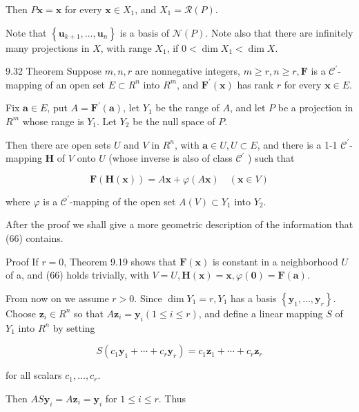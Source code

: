 \documentclass[10pt]{article}
\begin{document}
Then $P \mathbf{x}=\mathbf{x}$ for every $\mathbf{x} \in X_{1}$, and $X_{1}=\mathscr{R}(P)$.

Note that $\left\{\mathbf{u}_{k+1}, \ldots, \mathbf{u}_{n}\right\}$ is a basis of $\mathcal{N}(P)$. Note also that there are infinitely many projections in $X$, with range $X_{1}$, if $0<\operatorname{dim} X_{1}<\operatorname{dim} X$.

9.32 Theorem Suppose $m, n, r$ are nonnegative integers, $m \geq r, n \geq r, \mathbf{F}$ is a $\mathscr{C}^{\prime}$-mapping of an open set $E \subset R^{n}$ into $R^{m}$, and $\mathbf{F}^{\prime}(\mathbf{x})$ has rank $r$ for every $\mathbf{x} \in E$.

Fix $\mathbf{a} \in E$, put $A=\mathbf{F}^{\prime}(\mathbf{a})$, let $Y_{1}$ be the range of $A$, and let $P$ be a projection in $R^{m}$ whose range is $Y_{1}$. Let $Y_{2}$ be the null space of $P$.

Then there are open sets $U$ and $V$ in $R^{n}$, with $\mathbf{a} \in U, U \subset E$, and there is a 1-1 $\mathscr{C}^{\prime}$-mapping $\mathbf{H}$ of $V$ onto $U$ (whose inverse is also of class $\mathscr{C}^{\prime}$ ) such that

$$
\mathbf{F}(\mathbf{H}(\mathbf{x}))=A \mathbf{x}+\varphi(A \mathbf{x}) \quad(\mathbf{x} \in V)
$$

where $\varphi$ is a $\mathscr{C}^{\prime}$-mapping of the open set $A(V) \subset Y_{1}$ into $Y_{2}$.

After the proof we shall give a more geometric description of the information that (66) contains.

Proof If $r=0$, Theorem 9.19 shows that $\mathbf{F}(\mathbf{x})$ is constant in a neighborhood $U$ of a, and (66) holds trivially, with $V=U, \mathbf{H}(\mathbf{x})=\mathbf{x}, \varphi(\mathbf{0})=\mathbf{F}(\mathbf{a})$.

From now on we assume $r>0$. Since $\operatorname{dim} Y_{1}=r, Y_{1}$ has a basis $\left\{\mathbf{y}_{1}, \ldots, \mathbf{y}_{r}\right\}$. Choose $\mathbf{z}_{i} \in R^{n}$ so that $A \mathbf{z}_{i}=\mathbf{y}_{i}(1 \leq i \leq r)$, and define a linear mapping $S$ of $Y_{1}$ into $R^{n}$ by setting

$$
S\left(c_{1} \mathbf{y}_{1}+\cdots+c_{r} \mathbf{y}_{r}\right)=c_{1} \mathbf{z}_{1}+\cdots+c_{r} \mathbf{z}_{r}
$$

for all scalars $c_{1}, \ldots, c_{r}$.

Then $A S \mathbf{y}_{i}=A \mathbf{z}_{i}=\mathbf{y}_{i}$ for $1 \leq i \leq r$. Thus
\end{document}
